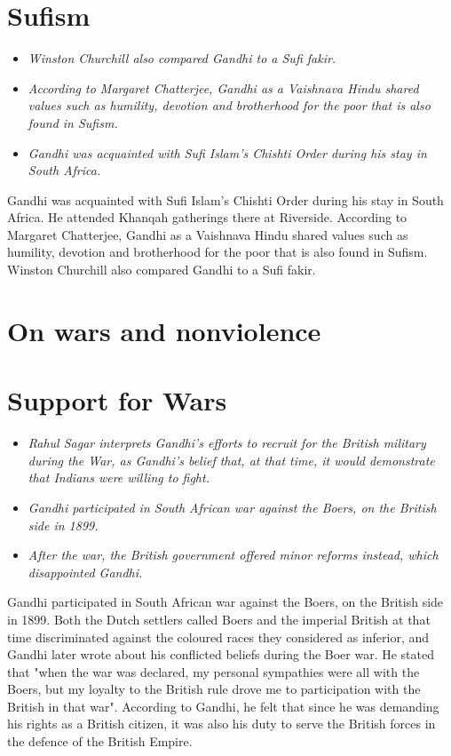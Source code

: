 \section{Sufism}\label{sufism}

\begin{itemize}
\item
  \emph{Winston Churchill also compared Gandhi to a Sufi fakir.}
\item
  \emph{According to Margaret Chatterjee, Gandhi as a Vaishnava Hindu
  shared values such as humility, devotion and brotherhood for the poor
  that is also found in Sufism.}
\item
  \emph{Gandhi was acquainted with Sufi Islam's Chishti Order during his
  stay in South Africa.}
\end{itemize}

Gandhi was acquainted with Sufi Islam's Chishti Order during his stay in
South Africa. He attended Khanqah gatherings there at Riverside.
According to Margaret Chatterjee, Gandhi as a Vaishnava Hindu shared
values such as humility, devotion and brotherhood for the poor that is
also found in Sufism. Winston Churchill also compared Gandhi to a Sufi
fakir.

\section{On wars and nonviolence}\label{on-wars-and-nonviolence}

\section{Support for Wars}\label{support-for-wars}

\begin{itemize}
\item
  \emph{Rahul Sagar interprets Gandhi's efforts to recruit for the
  British military during the War, as Gandhi's belief that, at that
  time, it would demonstrate that Indians were willing to fight.}
\item
  \emph{Gandhi participated in South African war against the Boers, on
  the British side in 1899.}
\item
  \emph{After the war, the British government offered minor reforms
  instead, which disappointed Gandhi.}
\end{itemize}

Gandhi participated in South African war against the Boers, on the
British side in 1899. Both the Dutch settlers called Boers and the
imperial British at that time discriminated against the coloured races
they considered as inferior, and Gandhi later wrote about his conflicted
beliefs during the Boer war. He stated that "when the war was declared,
my personal sympathies were all with the Boers, but my loyalty to the
British rule drove me to participation with the British in that war".
According to Gandhi, he felt that since he was demanding his rights as a
British citizen, it was also his duty to serve the British forces in the
defence of the British Empire.

